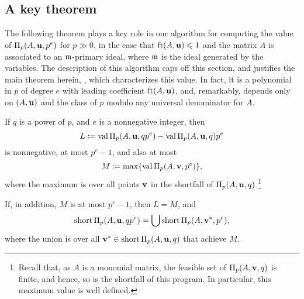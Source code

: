 \documentclass{amsart}
\begin{document}
\subsection{A key theorem}
The following theorem plays a key role in our algorithm for computing the value of $\Pi_p(A, \mathbf{u}, p^e)$ for $p \gg 0$, in the case that $\operatorname{ft}(A, \mathbf{u}) \leqslant 1$ and the matrix $A$ is associated to an $\mathfrak{m}$-primary ideal, where $\mathfrak{m}$ is the ideal generated by the variables.
The description of this algorithm caps off this section, and justifies the main theorem herein, , which characterizes this value.
In fact, it is a polynomial in $p$ of degree $e$ with leading coefficient $\operatorname{ft}(A, \mathbf{u})$, and, remarkably, depends only on $(A,\mathbf{u})$ and the class of $p$ modulo any universal denominator for $A$.

\begin{theorem}
\label{general AIP: T}
If $q$ is a power of $p$, and $e$ is a nonnegative integer, then
%
\[  L \coloneqq \operatorname{val} \Pi_p(A, \mathbf{u}, qp^e) -  \operatorname{val} \Pi_p(A, \mathbf{u}, q)p^e  \]
is nonnegative, at most $p^e-1$, and also at most
%
\[ M \coloneqq \max \{ \operatorname{val} \Pi_p(A, \mathbf{v}, p^e)  \},  \]
where the maximum is over all points $\mathbf{v}$ in the shortfall of $\Pi_p(A, \mathbf{u}, q)$.\footnote{
   Recall that, as $A$ is a monomial matrix, the feasible set of $\Pi_p(A, \mathbf{v}, q)$ is finite, and hence, so is the shortfall of this program.  In particular, this maximum value is well defined.
}

If, in addition, $M$ is at most $p^e-1$,  then $L=M$, and
\[  \operatorname{short} \Pi_p(A, \mathbf{u}, qp^e) = \bigcup \operatorname{short} \Pi_p(A, \mathbf{v}^{\ast}, p^e), \]
where the union is over all $\mathbf{v}^{\ast} \in \operatorname{short} \Pi_p(A, \mathbf{u}, q)$ that achieve $M$.
\end{theorem}
\end{document}
